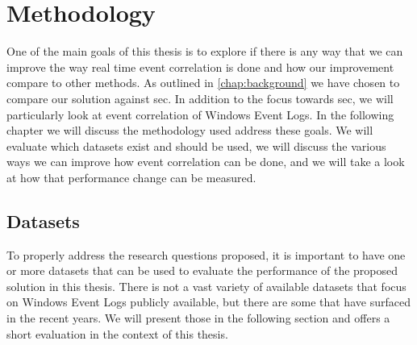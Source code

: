 \chapter{Methodology}
\label{chap:methodology}

\iffalse
The type of research you did
How you collected your data
How you analyzed your data
Any tools or materials you used in the research
Your rationale for choosing these methods

\begin{enumerate}
    \item What is the state of the art for real time event correlation?
    \item How can we improve the way real time event correlation is done for Windows Event Logs? %
    \item What is the performance of our proposed method, and how does it compare to other methods?
\end{enumerate}

\fi

One of the main goals of this thesis is to explore if there is any way that we can improve the way real time event correlation is done and how our improvement compare to other methods. As outlined in \cref{chap:background} we have chosen to compare our solution against \acrfull{sec}. In addition to the focus towards \acrshort{sec}, we will particularly look at event correlation of Windows Event Logs. In the following chapter we will discuss the methodology used address these goals. We will evaluate which datasets exist and should be used, we will discuss the various ways we can improve how event correlation can be done, and we will take a look at how that performance change can be measured.

\section{Datasets}
\label{sec:datasets}
To properly address the research questions proposed, it is important to have one or more datasets that can be used to evaluate the performance of the proposed solution in this thesis.
There is not a vast variety of available datasets that focus on Windows Event Logs publicly available, but there are some that have surfaced in the recent years. We will present those in the following section and offers a short evaluation in the context of this thesis.

